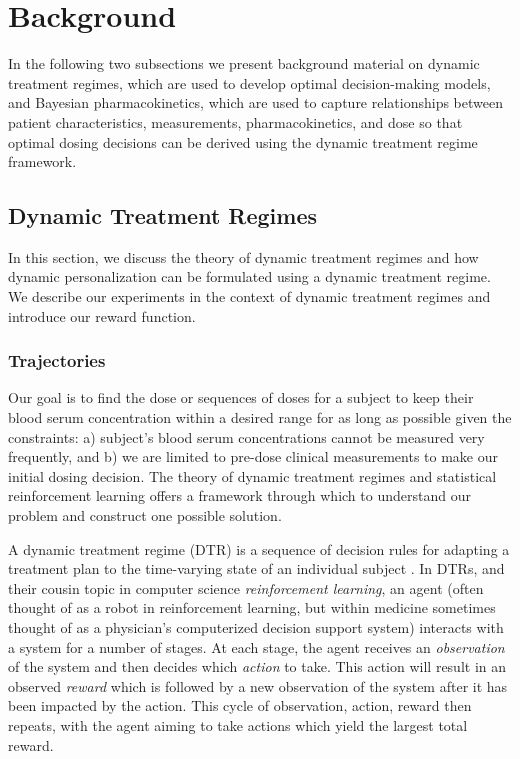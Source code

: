 \section{Background}\label{ss:background}

In the following two subsections we present background material on dynamic treatment regimes, which are used to develop optimal decision-making models, and Bayesian pharmacokinetics, which are used to capture relationships between patient characteristics, measurements, pharmacokinetics, and dose so that optimal dosing decisions can be derived using the dynamic treatment regime framework.

\subsection{Dynamic Treatment Regimes}

In this section, we discuss the theory of dynamic treatment regimes and how dynamic personalization can be formulated using a dynamic treatment regime.  We describe our experiments in the context of dynamic treatment regimes and introduce our reward function.

\subsubsection{Trajectories}

Our goal is to find the dose or sequences of doses for a subject to keep their blood serum concentration within a desired range for as long as possible given the constraints: a) subject’s blood serum concentrations cannot be measured very frequently, and b) we are limited to pre-dose clinical measurements to make our initial dosing decision.  The theory of dynamic treatment regimes and statistical reinforcement learning offers a framework through which to understand our problem and construct one possible solution.

A dynamic treatment regime (DTR) is a sequence of decision rules for adapting a treatment plan to the time-varying state of an individual subject \cite{chakraborty2013statistical}. In DTRs, and their cousin topic in computer science \textit{reinforcement learning}, an agent (often thought of as a robot in reinforcement learning, but within medicine sometimes thought of as a physician’s computerized decision support system) interacts with a system for a number of stages. At each stage, the agent receives an \textit{observation} of the system and then decides which \textit{action} to take.  This action will result in an observed \textit{reward} which is followed by a new observation of the system after it has been impacted by the action.  This cycle of observation, action, reward then repeats, with the agent aiming to take actions which yield the largest total reward.

